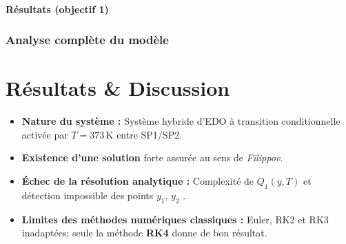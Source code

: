 \documentclass[handout]{beamer}
\newtheorem{pbm et hypo}[thm]{Problématique et hypothèses}
\begin{document}
	\begin{frame}
		\framesubtitle{\textbf{Résultats (objectif 1)}}
		\frametitle{\textbf{Analyse complète du modèle}}
	
		\section{Résultats \& Discussion}
		\pause
		\begin{itemize}
			\item[\maltese] \textbf{Nature du système :} Système hybride d'EDO à transition conditionnelle activée par $T = 373\,\mathrm{K}$ entre SP1/SP2.
			\pause
			\vspace{0.3cm}
			\item[\maltese] \textbf{Existence d'une solution} forte assurée au sens de \textit{Filippov}.
			\pause
			\vspace{0.3cm}
			\item[\maltese] \textbf{Échec de la résolution analytique :} Complexité de $Q_1(y,T)$ et détection impossible des points $y_1$, $y_2$ .
			\pause
			\vspace{0.3cm}
			\item[\maltese] \textbf{Limites des méthodes numériques classiques :}  
			Euler, RK2 et RK3 inadaptées; seule la méthode \textbf{RK4} donne de bon résultat.
		\end{itemize}
		
	\end{frame}
	
\end{document}
